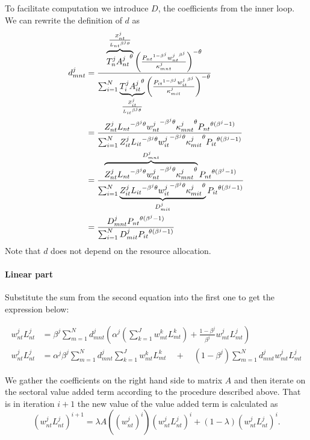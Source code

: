 \documentclass[12pt]{article}
\begin{document}
To facilitate computation we introduce $D$, the coefficients from the inner
loop. We can rewrite the definition of $d$ as 
\begin{align*}
d_{mnt}^j &= \frac{\overbrace{T_n^j {A_{nt}^j}^{\theta}}^{\frac{Z_{nt}^j}{{%
L_{nt}}^{\beta^j\theta}}} \left(\frac{{P_{nt}}^{1 - \beta^j} {w_{nt}^j}%
^{\beta^j}}{\kappa_{mnt}^j}\right)^{-\theta}}{\sum_{i = 1}^N \underbrace{%
T_i^j {A_{it}^j}^{\theta}}_{\frac{Z_{it}^j}{{L_{it}}^{\beta^j\theta}}} \left(%
\frac{{P_{it}}^{1 - \beta^j} {w_{it}^j}^{\beta^j}}{\kappa_{mit}^j}%
\right)^{-\theta}} \\
&= \frac{Z_{nt}^j {L_{nt}}^{- \beta^j\theta} {w_{nt}^j}^{-\beta^j\theta} {%
\kappa_{mnt}^j}^{\theta}{P_{nt}}^{\theta(\beta^j - 1)}}{\sum_{i = 1}^N
Z_{it}^j {L_{it}}^{- \beta^j\theta} {w_{it}^j}^{-\beta^j\theta} {%
\kappa_{mit}^j}^{\theta}{P_{it}}^{\theta(\beta^j - 1)}} \\
&= \frac{\overbrace{Z_{nt}^j {L_{nt}}^{- \beta^j\theta} {w_{nt}^j}%
^{-\beta^j\theta} {\kappa_{mnt}^j}^{\theta}}^{D_{mnt}^j}{P_{nt}}%
^{\theta(\beta^j - 1)}}{\sum_{i = 1}^N \underbrace{Z_{it}^j {L_{it}}^{-
\beta^j\theta} {w_{it}^j}^{-\beta^j\theta} {\kappa_{mit}^j}^{\theta}}%
_{D_{mit}^j}{P_{it}}^{\theta(\beta^j - 1)}} \\
&= \frac{D_{mnt}^j {P_{nt}}^{\theta(\beta^j - 1)}}{\sum_{i = 1}^N D_{mit}^j{%
P_{it}}^{\theta(\beta^j - 1)}}
\end{align*}
Note that $d$ does not depend on the resource allocation.

\paragraph{Linear part}

Substitute the sum from the second equation into the first one to get the
expression below:

\begin{align*}
w_{nt}^j L_{nt}^j &= \beta^j \sum_{m = 1}^N d_{mnt}^j \left( \alpha^j
\left(\sum_{k = 1}^J w_{mt}^k L_{mt}^k\right) + \frac{1 - \beta^j}{\beta^j}
w_{mt}^j L_{mt}^j\right) \\
w_{nt}^j L_{nt}^j &= \alpha^j \beta^j \sum_{m = 1}^N d_{mnt}^j \sum_{k =
1}^J w_{mt}^k L_{mt}^k \quad + \quad (1 - \beta^j)\sum_{m = 1}^N d_{mnt}^j
w_{mt}^j L_{mt}^j
\end{align*}

We gather the coefficients on the right hand side to matrix $A$ and then
iterate on the sectoral value added term according to the procedure
described above. That is in iteration $i + 1$ the new value of the value
added term is calculated as 
\begin{equation*}
\left(w_{nt}^j L_{nt}^j\right)^{i + 1} = \lambda
A\!\left(\left(w_{nt}^j\right)^i\right) \left(w_{nt}^j L_{nt}^j\right)^i +
(1 - \lambda) \left(w_{nt}^j L_{nt}^j\right)^i.
\end{equation*}
\end{document}
